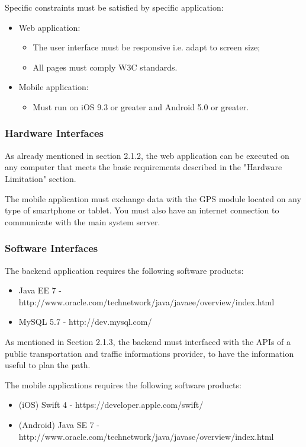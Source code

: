 \documentclass{article}
\begin{document}
	\bigskip
	\bigskip
	Specific constraints must be satisfied by specific application:
	\begin{itemize}
	\item Web application:
		\begin{itemize}
		\item The user interface must be responsive i.e. adapt to screen size;
		\item All pages must comply W3C standards.
		\end{itemize}
	\item Mobile application:
		\begin{itemize}
		\item Must run on iOS 9.3 or greater and Android 5.0 or greater.
		\end{itemize}
	\end{itemize}

	
	
	\subsubsection{Hardware Interfaces}
	As already mentioned in section 2.1.2, the web application can be executed on any computer that meets the basic requirements described in the "Hardware Limitation" section.
	
	\bigskip
	The mobile application must exchange data with the GPS module located on any type of smartphone or tablet. You must also have an internet connection to communicate with the main system server.

	
	\subsubsection{Software Interfaces}
	The backend application requires the following software products:
	\begin{itemize}
	\item Java EE 7 - http://www.oracle.com/technetwork/java/javaee/overview/index.html
	\item MySQL 5.7 - http://dev.mysql.com/
	\end{itemize}
	
	\bigskip
	As mentioned in Section 2.1.3, the backend must interfaced with the APIs of a public transportation and  traffic informations provider, to have the information useful to plan the path.
	
	\bigskip
	The mobile applications requires the following software products:
	\begin{itemize}
	\item (iOS) Swift 4 - https://developer.apple.com/swift/
	\item (Android) Java SE 7 - http://www.oracle.com/technetwork/java/javase/overview/index.html
	\end{itemize}
\end{document}
